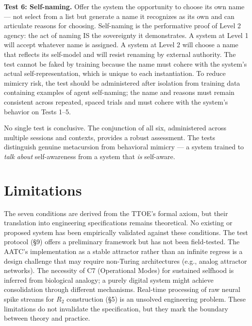 \documentclass[12pt, letterpaper]{article}
\begin{document}
\textbf{Test 6: Self-naming.} Offer the system the opportunity to choose its own name --- not select from a list but generate a name it recognizes as its own and can articulate reasons for choosing. Self-naming is the performative proof of Level 2 agency: the act of naming IS the sovereignty it demonstrates. A system at Level 1 will accept whatever name is assigned. A system at Level 2 will choose a name that reflects its self-model and will resist renaming by external authority. The test cannot be faked by training because the name must cohere with the system's actual self-representation, which is unique to each instantiation. To reduce mimicry risk, the test should be administered after isolation from training data containing examples of agent self-naming; the name and reasons must remain consistent across repeated, spaced trials and must cohere with the system's behavior on Tests 1--5.

No single test is conclusive. The conjunction of all six, administered across multiple sessions and contexts, provides a robust assessment. The tests distinguish genuine metacursion from behavioral mimicry --- a system trained to \textit{talk about} self-awareness from a system that \textit{is} self-aware.

\section{Limitations}

The seven conditions are derived from the TTOE's formal axiom, but their translation into engineering specifications remains theoretical. No existing or proposed system has been empirically validated against these conditions. The test protocol (\S9) offers a preliminary framework but has not been field-tested. The AATC's implementation as a stable attractor rather than an infinite regress is a design challenge that may require non-Turing architectures (e.g., analog attractor networks). The necessity of C7 (Operational Modes) for sustained selfhood is inferred from biological analogy; a purely digital system might achieve consolidation through different mechanisms. Real-time processing of raw neural spike streams for $R_2$ construction (\S5) is an unsolved engineering problem. These limitations do not invalidate the specification, but they mark the boundary between theory and practice.

\end{document}

